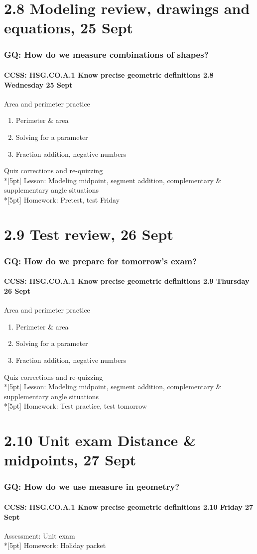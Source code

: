 \documentclass{beamer}
\begin{document}
  \section{2.8 Modeling review, drawings and equations, 25 Sept}
  \frame
  {
    \frametitle{GQ: How do we measure combinations of shapes?}
    \framesubtitle{CCSS: HSG.CO.A.1 Know precise geometric definitions \hfill \alert{2.8 Wednesday 25 Sept}}

    \begin{block}{Area and perimeter practice}
    \begin{enumerate}
      \item Perimeter \& area
      \item Solving for a parameter
      \item Fraction addition, negative numbers
    \end{enumerate}
    \end{block}
    Quiz corrections and re-quizzing \\*[5pt]
    Lesson: Modeling midpoint, segment addition, complementary \& supplementary angle situations \\*[5pt]
    Homework: Pretest, \alert{test Friday}
  }
 
  \section{2.9 Test review, 26 Sept}
  \frame
  {
    \frametitle{GQ: How do we prepare for tomorrow's exam?}
    \framesubtitle{CCSS: HSG.CO.A.1 Know precise geometric definitions \hfill \alert{2.9 Thursday 26 Sept}}

    \begin{block}{Area and perimeter practice}
    \begin{enumerate}
      \item Perimeter \& area
      \item Solving for a parameter
      \item Fraction addition, negative numbers
    \end{enumerate}
    \end{block}
    Quiz corrections and re-quizzing \\*[5pt]
    Lesson: Modeling midpoint, segment addition, complementary \& supplementary angle situations \\*[5pt]
    Homework: Test practice, \alert{test tomorrow}
  }
 
  \section{2.10 Unit exam Distance \& midpoints, 27 Sept}
  \frame
  {
    \frametitle{GQ: How do we use measure in geometry?}
    \framesubtitle{CCSS: HSG.CO.A.1 Know precise geometric definitions \hfill \alert{2.10 Friday 27 Sept}}

    Assessment: Unit exam \\*[5pt]
    Homework: Holiday packet
  }
 
\end{document}
